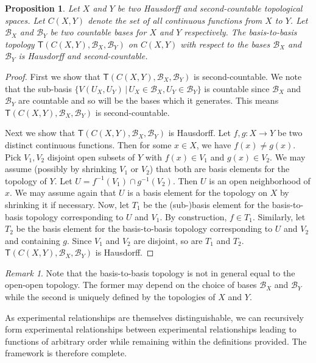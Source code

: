 \documentclass[preprint]{elsarticle}
\theoremstyle{plain}%
\newtheorem{prop}[thm]{Proposition}
\theoremstyle{definition}
\theoremstyle{remark}
\newtheorem*{rem}{Remark}
\begin{document}
\begin{prop}
	Let $X$ and $Y$ be two Hausdorff and second-countable topological spaces. Let $C(X,Y)$ denote the set of all continuous functions from $X$ to $Y$. Let $\mathcal{B}_X$ and $\mathcal{B}_Y$ be two countable bases for $X$ and $Y$ respectively. The basis-to-basis topology $\mathsf{T}(C(X,Y), \mathcal{B}_X, \mathcal{B}_Y)$ on $C(X,Y)$ with respect to the bases $\mathcal{B}_X$ and $\mathcal{B}_Y$ is Hausdorff and second-countable. 
\end{prop}
\begin{proof}
	First we show that $\mathsf{T}(C(X,Y), \mathcal{B}_X, \mathcal{B}_Y)$ is second-countable. We note that the sub-basis $\{V(U_X, U_Y) \, |\,   U_X \in \mathcal{B}_X , U_Y \in \mathcal{B}_Y \}$ is countable since $\mathcal{B}_X$ and $\mathcal{B}_Y$ are countable and so will be the bases which it generates. This means $\mathsf{T}(C(X,Y), \mathcal{B}_X, \mathcal{B}_Y)$ is second-countable.
	
	Next we show that $\mathsf{T}(C(X,Y), \mathcal{B}_X, \mathcal{B}_Y)$ is Hausdorff. Let $f,g:X\to Y$ be two distinct continuous functions. Then for some $x\in X$, we have $f(x)\neq g(x)$. Pick $V_1, V_2$ disjoint open subsets of $Y$ with $f(x)\in V_1$ and $g(x)\in V_2$. We may assume (possibly by shrinking $V_1$ or $V_2$) that both are basis elements for the topology of $Y$. Let $U=f^{-1}(V_1)\cap g^{-1}(V_2)$. Then $U$ is an open neighborhood of $x$. We may assume again that $U$ is a basis element for the topology on $X$ by shrinking it if necessary. Now, let $T_1$ be the (sub-)basis element for the basis-to-basis topology corresponding to $U$ and $V_1$. By construction, $f\in T_1$. Similarly, let $T_2$ be the basis element for the basis-to-basis topology corresponding to $U$ and $V_2$ and containing $g$. Since $V_1$ and $V_2$ are disjoint, so are $T_1$ and $T_2$. $\mathsf{T}(C(X,Y), \mathcal{B}_X, \mathcal{B}_Y)$ is Hausdorff.
\end{proof}

\begin{rem}
	Note that the basis-to-basis topology is not in general equal to the open-open topology. The former may depend on the choice of bases $\mathcal{B}_X$ and $\mathcal{B}_Y$ while the second is uniquely defined by the topologies of $X$ and $Y$.
\end{rem}

As experimental relationships are themselves distinguishable, we can recursively form experimental relationships between experimental relationships leading to functions of arbitrary order while remaining within the definitions provided. The framework is therefore complete.
\end{document}
